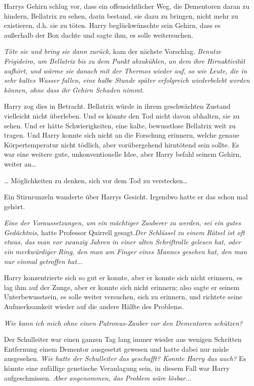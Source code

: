 {Harrys Gehirn schlug vor, dass ein offensichtlicher Weg, die Dementoren daran zu hindern, Bellatrix zu sehen, darin bestand, sie dazu zu bringen, nicht mehr zu existieren, d.h. sie zu töten. Harry beglückwünschte sein Gehirn, dass es außerhalb der Box dachte und sagte ihm, es solle weitersuchen.

\emph{Töte sie und bring sie dann zurück,} kam der nächste Vorschlag. \emph{Benutze Frigideiro, um Bellatrix bis zu dem Punkt abzukühlen, an dem ihre Hirnaktivität aufhört, und wärme sie danach mit der Thermos wieder auf, so wie Leute, die in sehr kaltes Wasser fallen, eine halbe Stunde später erfolgreich wiederbelebt werden können, ohne dass ihr Gehirn Schaden nimmt.}

Harry zog dies in Betracht. Bellatrix würde in ihrem geschwächten Zustand vielleicht nicht überleben. Und es könnte den Tod nicht davon abhalten, sie zu sehen. Und er hätte Schwierigkeiten, eine kalte, bewusstlose Bellatrix weit zu tragen. Und Harry konnte sich nicht an die Forschung erinnern, welche genaue Körpertemperatur nicht tödlich, aber vorübergehend hirntötend sein sollte. Es war eine weitere gute, unkonventionelle Idee, aber Harry befahl seinem Gehirn, weiter an…

… Möglichkeiten zu denken, sich vor dem Tod zu verstecken…

Ein Stirnrunzeln wanderte über Harrys Gesicht. Irgendwo hatte er das schon mal gehört.

\emph{Eine der Voraussetzungen, um ein mächtiger Zauberer zu werden, sei ein gutes Gedächtnis,} hatte Professor Quirrell gesagt.\emph{\hfill\break Der Schlüssel zu einem Rätsel ist oft etwas, das man vor zwanzig Jahren in einer alten Schriftrolle gelesen hat, oder ein merkwürdiger Ring, den man am Finger eines Mannes gesehen hat, den man nur einmal getroffen hat.}..

Harry konzentrierte sich so gut er konnte, aber er konnte sich nicht erinnern, es lag ihm auf der Zunge, aber er konnte sich nicht erinnern; also sagte er seinem Unterbewusstsein, es solle weiter versuchen, sich zu erinnern, und richtete seine Aufmerksamkeit wieder auf die andere Hälfte des Problems.

\emph{Wie kann ich mich ohne einen Patronus-Zauber vor den Dementoren schützen?}

Der Schulleiter war einen ganzen Tag lang immer wieder aus wenigen Schritten Entfernung einem Dementor ausgesetzt gewesen und hatte dabei nur müde ausgesehen. \emph{Wie hatte der Schulleiter das geschafft? Konnte Harry das auch?} Es könnte eine zufällige genetische Veranlagung sein, in diesem Fall war Harry aufgeschmissen. \emph{Aber angenommen, das Problem wäre lösbar.}..

}
